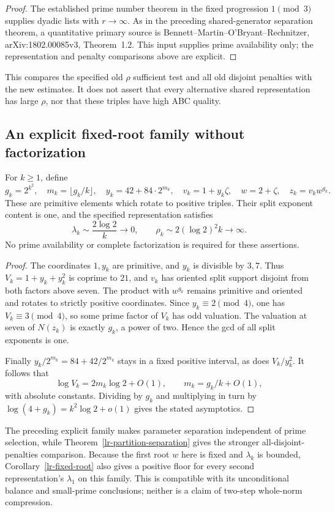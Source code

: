 \begin{proof}
The established prime number theorem in the fixed progression $1\pmod3$
supplies dyadic lists with $r\to\infty$. As in the preceding shared-generator
separation theorem, a quantitative primary source is
Bennett--Martin--O'Bryant--Rechnitzer, arXiv:1802.00085v3, Theorem~1.2.
This input supplies prime availability only; the representation and penalty
comparisons above are explicit.
\end{proof}
This compares the specified old $\rho$ sufficient test and all old disjoint
penalties with the new estimates. It does not assert that every alternative
shared representation has large $\rho$, nor that these triples have high
ABC quality.

\subsection{An explicit fixed-root family without factorization}
\begin{theorem}\label{lr-explicit-family}
For $k\ge1$, define
\[
 g_k=2^{k^2},\quad m_k=\lfloor g_k/k\rfloor,\quad
 y_k=42+84\cdot2^{m_k},\quad v_k=1+y_k\zeta,\quad
 w=2+\zeta,\quad z_k=v_kw^{g_k}.
\]
These are primitive elements which rotate to positive triples. Their
split exponent content is one, and the specified representation satisfies
\[
 \lambda_k\sim\frac{2\log2}{k}\longrightarrow0,\qquad
 \rho_k\sim2(\log2)^2k\longrightarrow\infty.
\]
No prime availability or complete factorization is required for these
assertions.
\end{theorem}
\begin{proof}
The coordinates $1,y_k$ are primitive, and $y_k$ is divisible by $3,7$.
Thus $V_k=1+y_k+y_k^2$ is coprime to $21$, and $v_k$ has oriented split
support disjoint from both factors above seven. The product with $w^{g_k}$
remains primitive and oriented and rotates to strictly positive coordinates.
Since $y_k\equiv2\pmod4$, one has $V_k\equiv3\pmod4$, so some prime
factor of $V_k$ has odd valuation. The valuation at seven of $N(z_k)$ is
exactly $g_k$, a power of two. Hence the gcd of all split exponents is one.

Finally $y_k/2^{m_k}=84+42/2^{m_k}$ stays in a fixed positive interval, as
does $V_k/y_k^2$. It follows that
\[
 \log V_k=2m_k\log2+O(1),\qquad m_k=g_k/k+O(1),
\]
with absolute constants. Dividing by $g_k$ and multiplying in turn by
$\log(4+g_k)=k^2\log2+o(1)$ gives the stated asymptotics.
\end{proof}
The preceding explicit family makes parameter separation independent of
prime selection, while Theorem~\ref{lr-partition-separation} gives the
stronger all-disjoint-penalties comparison. Because the first root $w$ here
is fixed and $\lambda_k$ is bounded, Corollary~\ref{lr-fixed-root} also
gives a positive floor for every second representation's $\lambda_1$ on
this family. This is compatible with its unconditional balance and
small-prime conclusions; neither is a claim of two-step whole-norm compression.

